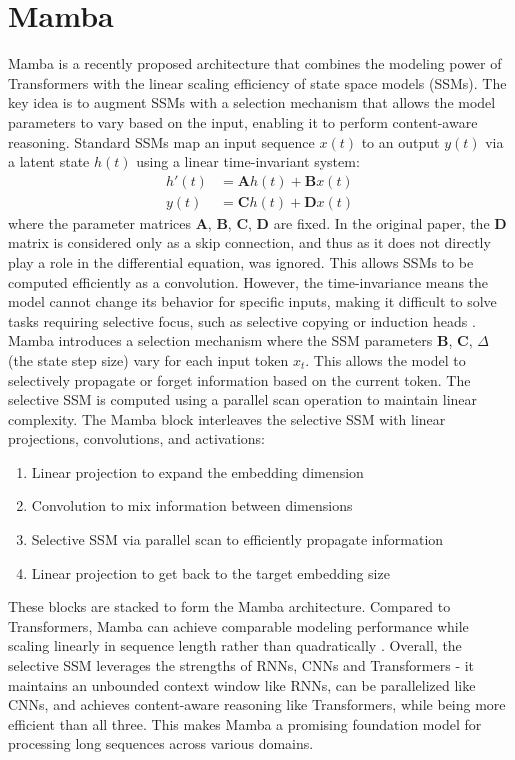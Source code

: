 \documentclass[conference]{IEEEtran}
\begin{document}
\section{Mamba}
Mamba \cite{gu2023mamba} is a recently proposed architecture that combines the modeling power of Transformers with the linear scaling efficiency of state space models (SSMs). The key idea is to augment SSMs with a selection mechanism that allows the model parameters to vary based on the input, enabling it to perform content-aware reasoning.
Standard SSMs map an input sequence $x(t)$ to an output $y(t)$ via a latent state $h(t)$ using a linear time-invariant system:
\begin{align*}
h'(t) & = \mathbf{A}h(t) + \mathbf{B}x(t) \\
y(t)  & = \mathbf{C}h(t) + \mathbf{D}x(t)
\end{align*}
where the parameter matrices $\mathbf{A}$, $\mathbf{B}$, $\mathbf{C}$, $\mathbf{D}$ are fixed. In the original paper, the $\mathbf{D}$ matrix is considered only as a skip connection, and thus as it does not directly play a role in the differential equation, was ignored. This allows SSMs to be computed efficiently as a convolution. However, the time-invariance means the model cannot change its behavior for specific inputs, making it difficult to solve tasks requiring selective focus, such as selective copying or induction heads \cite{gu2023mamba}.
Mamba introduces a selection mechanism where the SSM parameters $\mathbf{B}$, $\mathbf{C}$, $\Delta$ (the state step size) vary for each input token $x_t$. This allows the model to selectively propagate or forget information based on the current token. The selective SSM is computed using a parallel scan operation to maintain linear complexity.
The Mamba block interleaves the selective SSM with linear projections, convolutions, and activations:
\begin{enumerate}
\item Linear projection to expand the embedding dimension
\item Convolution to mix information between dimensions
\item Selective SSM via parallel scan to efficiently propagate information
\item Linear projection to get back to the target embedding size
\end{enumerate}
These blocks are stacked to form the Mamba architecture. Compared to Transformers, Mamba can achieve comparable modeling performance while scaling linearly in sequence length rather than quadratically \cite{gu2023mamba}. Overall, the selective SSM leverages the strengths of RNNs, CNNs and Transformers - it maintains an unbounded context window like RNNs, can be parallelized like CNNs, and achieves content-aware reasoning like Transformers, while being more efficient than all three. This makes Mamba a promising foundation model for processing long sequences across various domains.
\end{document}
